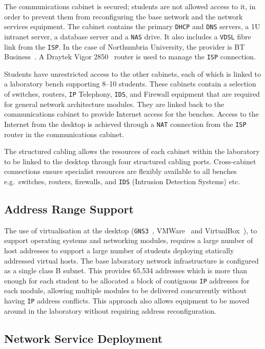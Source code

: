\documentclass{llncs}
\begin{document}
The communications cabinet is secured; students are not allowed access to it,
in order to prevent them from reconfiguring the base network and the network
services equipment.  The cabinet contains the primary \texttt{DHCP} and
\texttt{DNS} servers, a 1U intranet server, a database server and a
\texttt{NAS} drive. It also includes a \texttt{VDSL} fibre link from the
\texttt{ISP}. In the case of Northumbria University, the provider is BT
Business~\cite{BT:17}. A Draytek Vigor 2850~\cite{DC:17} router is used to
manage the \texttt{ISP} connection.

Students have unrestricted access to the other cabinets, each of which is
linked to a laboratory bench supporting 8--10 students. These cabinets contain
a selection of switches, routers, \texttt{IP} Telephony, \texttt{IDS}, and
Firewall equipment that are required for general network architecture modules.
They are linked back to the communications cabinet to provide Internet access
for the benches. Access to the Internet from the desktop is achieved through a
\texttt{NAT} connection from the \texttt{ISP} router in the communications
cabinet. 

The structured cabling allows the resources of each cabinet within the
laboratory to be linked to the desktop through four structured cabling ports.
Cross-cabinet connections ensure specialist resources are flexibly available to
all benches e.g.\ switches, routers, firewalls, and \texttt{IDS} (Intrusion
Detection Systems) etc.

\subsection{Address Range Support}

The use of virtualisation at the desktop (\texttt{GNS3}~\cite{GNS3:17},
VMWare~\cite{VMWARE:17} and VirtualBox~\cite{O:17}), to support operating
systems and networking modules, requires a large number of host addresses to
support a large number of students deploying statically addressed virtual
hosts. The base laboratory network infrastructure is configured as a single
class B subnet.  This provides 65,534 addresses which is more than enough for
each student to be allocated a block of contiguous \texttt{IP} addresses for
each module, allowing multiple modules to be delivered concurrently without
having \texttt{IP} address conflicts.  This approach also allows equipment to
be moved around in the laboratory without requiring address reconfiguration.

\subsection{Network Service Deployment}\label{InfraService}
\end{document}
